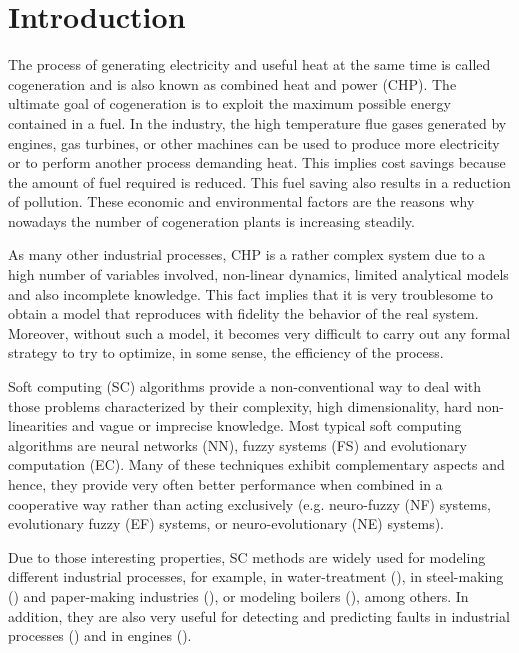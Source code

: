\section{Introduction}
\label{intro}

The process of generating electricity and useful heat at the same time is called cogeneration and is also known as combined heat and power (CHP). The ultimate goal of cogeneration is to exploit the maximum possible energy contained in a fuel. In the industry, the high temperature flue gases generated by engines, gas turbines, or other machines can be used to produce more electricity or to perform another process demanding heat. This implies cost savings because the amount of fuel required is reduced. This fuel saving also results in a reduction of pollution. These economic and environmental factors are the reasons why nowadays the number of cogeneration plants is increasing steadily. 

As many other industrial processes, CHP is a rather complex system due to a high number of variables involved, non-linear dynamics, limited analytical models and also incomplete knowledge. This fact implies that it is very troublesome to obtain a model that reproduces with fidelity the behavior of the real system. Moreover, without such a model, it becomes very difficult to carry out any formal strategy to try to optimize, in some sense, the efficiency of the process.

Soft computing (SC) algorithms provide a non-conventional way to deal with those problems characterized by their complexity, high dimensionality, hard non-linearities and vague or imprecise knowledge. Most typical soft computing algorithms are neural networks (NN), fuzzy systems (FS) and evolutionary computation (EC). Many of these techniques exhibit complementary  aspects and hence, they provide very often better performance when combined in a cooperative way rather than acting exclusively (e.g. neuro-fuzzy (NF) systems, evolutionary fuzzy (EF) systems, or neuro-evolutionary (NE) systems).

Due to those interesting properties, SC methods are widely used for modeling different industrial processes, for example, in water-treatment (\cite{Noshadi-2013}), in steel-making (\cite{Isazadeh-2012}) and paper-making industries (\cite{Zhang-2012}), or modeling boilers (\cite{Budnik-2012,Huang-2009}), among others. In addition, they are also very useful for detecting and predicting faults in industrial processes (\cite{Rakhshani-2009,Lemma-2013}) and in engines (\cite{Shatnawi-2014,Ghate-2011,Refaat-2013}). 


